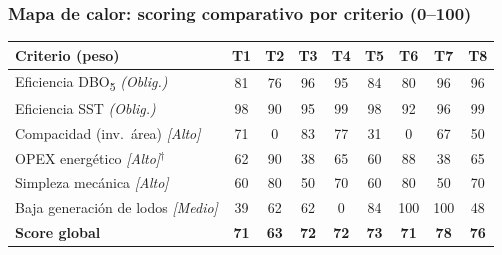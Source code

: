 \documentclass[aspectratio=169]{beamer}
\begin{document}
\begin{frame}
\frametitle{Mapa de calor: scoring comparativo por criterio (0--100)}
\centering
\scriptsize
\renewcommand{\arraystretch}{1.3}
\begin{tabular}{l*{8}{c}}
\toprule
\textbf{Criterio (peso)} & \textbf{T1} & \textbf{T2} & \textbf{T3} & \textbf{T4} & \textbf{T5} & \textbf{T6} & \textbf{T7} & \textbf{T8} \\
\midrule
Eficiencia DBO\textsubscript{5} \textit{(Oblig.)} & \cellcolor{verdebueno!81}81 & \cellcolor{verdebueno!76}76 & \cellcolor{verdebueno!96}96 & \cellcolor{verdebueno!95}95 & \cellcolor{verdebueno!84}84 & \cellcolor{verdebueno!80}80 & \cellcolor{verdebueno!96}96 & \cellcolor{verdebueno!96}96 \\
Eficiencia SST \textit{(Oblig.)} & \cellcolor{verdebueno!98}98 & \cellcolor{verdebueno!90}90 & \cellcolor{verdebueno!95}95 & \cellcolor{verdebueno!99}99 & \cellcolor{verdebueno!98}98 & \cellcolor{verdebueno!92}92 & \cellcolor{verdebueno!96}96 & \cellcolor{verdebueno!99}99 \\
Compacidad (inv.\ \'{a}rea) \textit{[Alto]} & \cellcolor{amarillomedio!71}71 & \cellcolor{rojomalo!0}0 & \cellcolor{verdebueno!83}83 & \cellcolor{verdebueno!77}77 & \cellcolor{amarillomedio!31}31 & \cellcolor{rojomalo!0}0 & \cellcolor{verdebueno!67}67 & \cellcolor{amarillomedio!50}50 \\
OPEX energ\'{e}tico \textit{[Alto]}$^\dagger$ & \cellcolor{amarillomedio!62}62 & \cellcolor{verdebueno!90}90 & \cellcolor{rojomalo!38}38 & \cellcolor{amarillomedio!65}65 & \cellcolor{amarillomedio!60}60 & \cellcolor{verdebueno!88}88 & \cellcolor{rojomalo!38}38 & \cellcolor{amarillomedio!65}65 \\
Simpleza mec\'{a}nica \textit{[Alto]} & \cellcolor{amarillomedio!60}60 & \cellcolor{verdebueno!80}80 & \cellcolor{amarillomedio!50}50 & \cellcolor{verdebueno!70}70 & \cellcolor{amarillomedio!60}60 & \cellcolor{verdebueno!80}80 & \cellcolor{amarillomedio!50}50 & \cellcolor{verdebueno!70}70 \\
Baja generaci\'{o}n de lodos \textit{[Medio]} & \cellcolor{amarillomedio!39}39 & \cellcolor{amarillomedio!62}62 & \cellcolor{amarillomedio!62}62 & \cellcolor{rojomalo!0}0 & \cellcolor{verdebueno!84}84 & \cellcolor{verdebueno!100}100 & \cellcolor{verdebueno!100}100 & \cellcolor{amarillomedio!48}48 \\
\midrule
\textbf{Score global} & \cellcolor{amarillomedio!71}\textbf{71} & \cellcolor{amarillomedio!63}\textbf{63} & \cellcolor{amarillomedio!72}\textbf{72} & \cellcolor{amarillomedio!72}\textbf{72} & \cellcolor{amarillomedio!73}\textbf{73} & \cellcolor{amarillomedio!71}\textbf{71} & \cellcolor{verdebueno!78}\textbf{78} & \cellcolor{verdebueno!76}\textbf{76} \\
\bottomrule
\end{tabular}


\end{frame}
\end{document}
